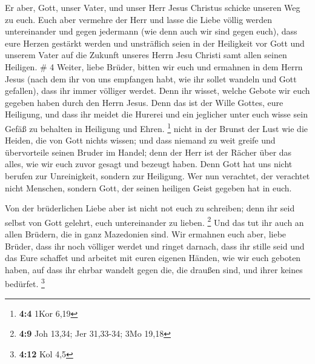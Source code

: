  Er aber, Gott, unser Vater, und unser Herr Jesus
Christus schicke unseren Weg zu euch.  Euch aber vermehre
der Herr und lasse die Liebe völlig werden untereinander und gegen
jedermann (wie denn auch wir sind gegen euch),  dass eure
Herzen gestärkt werden und unsträflich seien in der Heiligkeit vor Gott
und unserem Vater auf die Zukunft unseres Herrn Jesu Christi samt allen
seinen Heiligen. \# 4  Weiter, liebe Brüder, bitten wir
euch und ermahnen in dem Herrn Jesus (nach dem ihr von uns empfangen
habt, wie ihr sollet wandeln und Gott gefallen), dass ihr immer völliger
werdet.  Denn ihr wisset, welche Gebote wir euch gegeben
haben durch den Herrn Jesus.  Denn das ist der Wille
Gottes, eure Heiligung, und dass ihr meidet die Hurerei 
und ein jeglicher unter euch wisse sein Gefäß zu behalten in Heiligung
und Ehren. \footnote{\textbf{4:4} 1Kor 6,19}  nicht in der
Brunst der Lust wie die Heiden, die von Gott nichts wissen;
 und dass niemand zu weit greife und übervorteile seinen
Bruder im Handel; denn der Herr ist der Rächer über das alles, wie wir
euch zuvor gesagt und bezeugt haben.  Denn Gott hat uns
nicht berufen zur Unreinigkeit, sondern zur Heiligung. 
Wer nun verachtet, der verachtet nicht Menschen, sondern Gott, der
seinen heiligen Geist gegeben hat in euch.

 Von der brüderlichen Liebe aber ist nicht not euch zu
schreiben; denn ihr seid selbst von Gott gelehrt, euch untereinander zu
lieben. \footnote{\textbf{4:9} Joh 13,34; Jer 31,33-34; 3Mo 19,18}
 Und das tut ihr auch an allen Brüdern, die in ganz
Mazedonien sind. Wir ermahnen euch aber, liebe Brüder, dass ihr noch
völliger werdet  und ringet darnach, dass ihr stille seid
und das Eure schaffet und arbeitet mit euren eigenen Händen, wie wir
euch geboten haben,  auf dass ihr ehrbar wandelt gegen
die, die draußen sind, und ihrer keines bedürfet. \footnote{\textbf{4:12}
  Kol 4,5}

